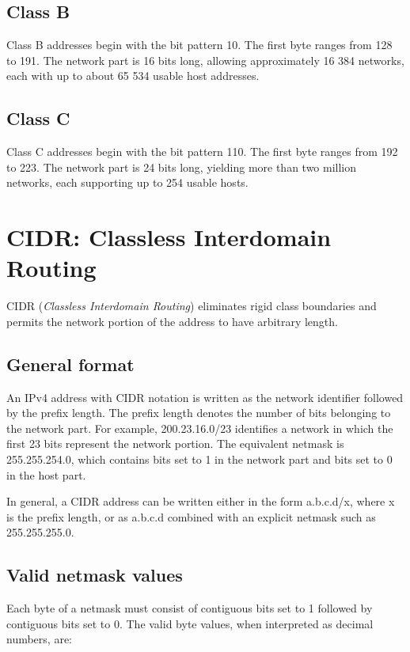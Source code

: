 \documentclass[11pt,a4paper,openany]{report}
\begin{document}
\subsection{Class B}

Class B addresses begin with the bit pattern 10. The first byte ranges from 128 to 191. The network part is 16 bits long, allowing approximately 16 384 networks, each with up to about 65 534 usable host addresses.

\subsection{Class C}

Class C addresses begin with the bit pattern 110. The first byte ranges from 192 to 223. The network part is 24 bits long, yielding more than two million networks, each supporting up to 254 usable hosts.

\section{CIDR: Classless Interdomain Routing}

CIDR (\emph{Classless Interdomain Routing}) eliminates rigid class boundaries and permits the network portion of the address to have arbitrary length.

\subsection{General format}

An IPv4 address with CIDR notation is written as the network identifier followed by the prefix length. The prefix length denotes the number of bits belonging to the network part. For example, 200.23.16.0/23 identifies a network in which the first 23 bits represent the network portion. The equivalent netmask is 255.255.254.0, which contains bits set to 1 in the network part and bits set to 0 in the host part.

In general, a CIDR address can be written either in the form a.b.c.d/x, where x is the prefix length, or as a.b.c.d combined with an explicit netmask such as 255.255.255.0.

\subsection{Valid netmask values}

Each byte of a netmask must consist of contiguous bits set to 1 followed by contiguous bits set to 0. The valid byte values, when interpreted as decimal numbers, are:
\end{document}
